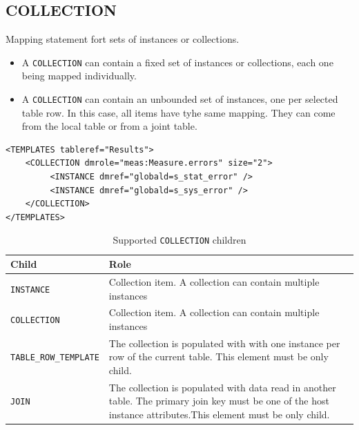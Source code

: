 \documentclass[11pt,a4paper]{ivoa}
\begin{document}
%
%
\subsection{COLLECTION}
Mapping statement fort sets of instances or collections.

\begin{itemize}
    \item A \texttt{COLLECTION} can contain a fixed set of instances or collections, each one being mapped individually.  
    \item A \texttt{COLLECTION} can contain an unbounded set of instances, one per selected table row. 
            In this case, all items have tyhe same mapping. They can come from the local table or from a joint table.
 \end{itemize}


\begin{lstlisting}[caption={COLLECTION example},style=XML]
<TEMPLATES tableref="Results">
    <COLLECTION dmrole="meas:Measure.errors" size="2">
         <INSTANCE dmref="globald=s_stat_error" />         
         <INSTANCE dmref="globald=s_sys_error" />
    </COLLECTION>
</TEMPLATES>
\end{lstlisting}

\begin{table}[hbtp]
\small
\centering
\begin{tabulary}{\linewidth}{|L|J|}
       \hline 
           \textbf{Child} &
           \textbf{Role}\\
       \hline  
           \texttt{INSTANCE}    & 
           Collection item. A collection can contain multiple instances \\              
       \hline  
           \texttt{COLLECTION}    & 
          Collection item. A collection can contain multiple instances \\       
       \hline  
           \texttt{TABLE\_ROW\_TEMPLATE}    & 
          The collection is populated with with one instance per row of the current table. This element must be only child. \\       
       \hline  
          \texttt{JOIN}    & 
         The collection is populated with data read in another table. The primary join key must be one of the host instance attributes.This element must be only child. \\      
       \hline 
\end{tabulary}
\caption{Supported  \texttt{COLLECTION} children} 
\label{tbl:coll-children}
\end{table}
\end{document}
